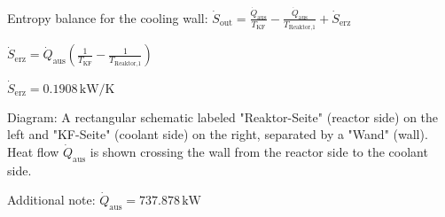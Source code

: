 Entropy balance for the cooling wall:  
\( \dot{S}_{\text{out}} = \frac{\dot{Q}_{\text{aus}}}{T_{\text{KF}}} - \frac{\dot{Q}_{\text{aus}}}{T_{\text{Reaktor,1}}} + \dot{S}_{\text{erz}} \)  

\( \dot{S}_{\text{erz}} = \dot{Q}_{\text{aus}} \left( \frac{1}{T_{\text{KF}}} - \frac{1}{T_{\text{Reaktor,1}}} \right) \)  

\( \dot{S}_{\text{erz}} = 0.1908 \, \text{kW/K} \)  

Diagram:  
A rectangular schematic labeled "Reaktor-Seite" (reactor side) on the left and "KF-Seite" (coolant side) on the right, separated by a "Wand" (wall). Heat flow \( \dot{Q}_{\text{aus}} \) is shown crossing the wall from the reactor side to the coolant side.  

Additional note:  
\( \dot{Q}_{\text{aus}} = 737.878 \, \text{kW} \)